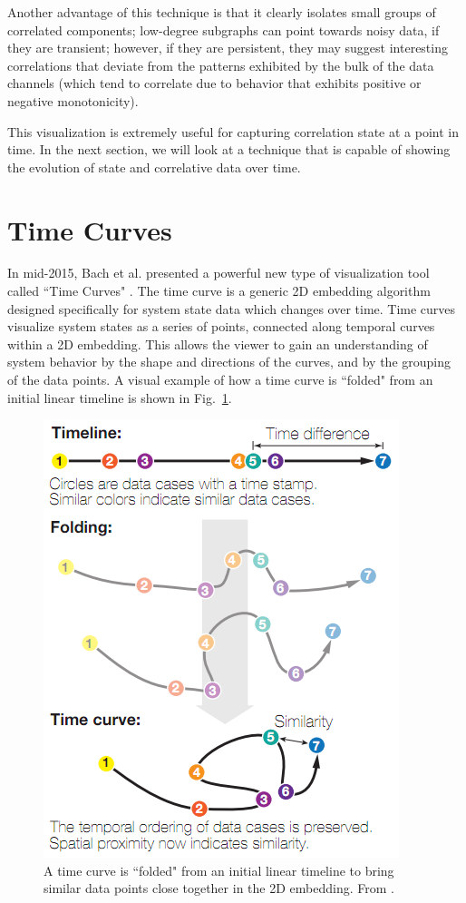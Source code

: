 Another advantage of this technique is that it clearly isolates small groups of correlated components; low-degree subgraphs can point towards noisy data, if they are transient; however, if they are persistent, they may suggest interesting correlations that deviate from the patterns exhibited by the bulk of the data channels (which tend to correlate due to behavior that exhibits positive or negative monotonicity).

This visualization is extremely useful for capturing correlation state at a point in time. In the next section, we will look at a technique that is capable of showing the evolution of state and correlative data over time.

\section{Time Curves}

In mid-2015, Bach et al. presented a powerful new type of visualization tool called ``Time Curves" \cite{bach2016time}. The time curve is a generic 2D embedding algorithm designed specifically for system state data which changes over time. Time curves visualize system states as a series of points, connected along temporal curves within a 2D embedding. This allows the viewer to gain an understanding of system behavior by the shape and directions of the curves, and by the grouping of the data points. A visual example of how a time curve is ``folded" from an initial linear timeline is shown in Fig.~\ref{fig:time_curve_example}.

\begin{figure}[h]
\centering
    \includegraphics[width=0.5\columnwidth]{images/time_curve_example.png}
    \caption{A time curve is ``folded" from an initial linear timeline to bring similar data points close together in the 2D embedding. From \cite{bach2016time}.}
    \label{fig:time_curve_example}
\end{figure}

